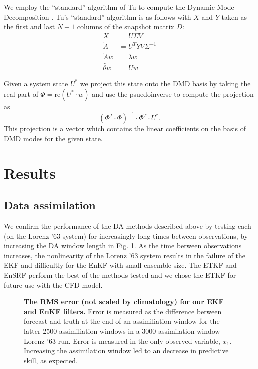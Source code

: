 \documentclass[10pt,letterpaper]{article}
\begin{document}
We employ the ``standard'' algorithm of Tu to compute the Dynamic Mode Decomposition \cite{tu2013dynamic}.
Tu's ``standard'' algorithm is as follows with $X$ and $Y$ taken as the first and last $N-1$ columns of the snapshot matrix $D$:
\begin{align*} X &= U\Sigma V \tag*{(Take SVD of $X$.)}\\
  \tilde{A} &= U^T Y V \Sigma ^{-1} \tag*{(Build the $A$ matrix.)}\\
  \tilde{A}w &= \lambda w \tag*{(Compute eigenvectors and values.)}\\
  \hat{\theta}w &= U w \tag*{(Compute corresponding modes.)}\end{align*}

Given a system state $U^*$ we project this state onto the DMD basis by taking the real part of $\Phi = \text{re}\left (U^*\cdot w\right)$ and use the psuedoinverse to compute the projection as $$(\Phi^T \cdot \Phi)^{-1} \cdot \Phi ^T \cdot U^*.$$
This projection is a vector which contains the linear coefficients on the basis of DMD modes for the given state.

\section*{Results}

\subsection*{Data assimilation}
\label{data_assimilation_section}

We confirm the performance of the DA methods described above by testing each (on the Lorenz '63 system) for increasingly long times between observations, by increasing the DA window length in Fig. \ref{fig:window_test}.
As the time between observations increases, the nonlinearity of the Lorenz '63 system results in the failure of the EKF and difficultly for the EnKF with small ensemble size.
The ETKF and EnSRF perform the best of the methods tested and we chose the ETKF for future use with the CFD model.

\begin{figure}[h]
  \centering
  \caption[The RMS error is reported for our EKF and EnKF filters]{
\textbf{    The RMS error (not scaled by climatology) for our EKF and EnKF filters.
}    Error is measured as the difference between forecast and truth at the end of an assimiliation window for the latter 2500 assimiliation windows in a 3000 assimilation window Lorenz '63 run.
    Error is measured in the only observed variable, $x_1$.
    Increasing the assimilation window led to an decrease in predictive skill, as expected.
  }
  \label{fig:window_test}
\end{figure}
\end{document}
